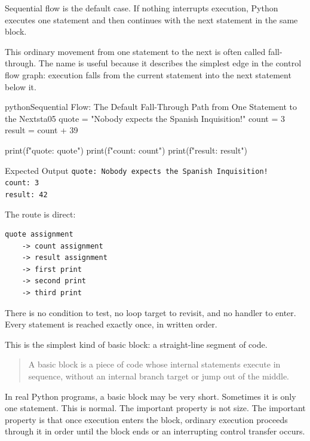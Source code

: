 \documentclass[a4paper,twoside]{report}
\begin{document}
Sequential flow is the default case. If nothing interrupts execution, Python executes one statement and then continues with the next statement in the same block.

This ordinary movement from one statement to the next is often called fall-through. The name is useful because it describes the simplest edge in the control flow graph: execution falls from the current statement into the next statement below it.

\begin{codebox}[]{python}{Sequential Flow: The Default Fall-Through Path from One Statement to the Next}{sta05}
quote = "Nobody expects the Spanish Inquisition!"
count = 3
result = count + 39

print(f"quote: {quote}")
print(f"count: {count}")
print(f"result: {result}")
\end{codebox}


\begin{iobox}{Expected Output}
\texttt{quote: Nobody expects the Spanish Inquisition!} \\
\texttt{count: 3} \\
\texttt{result: 42} \\
\end{iobox}


The route is direct:

\begin{verbatim}
quote assignment
    -> count assignment
    -> result assignment
    -> first print
    -> second print
    -> third print
\end{verbatim}

There is no condition to test, no loop target to revisit, and no handler to enter. Every statement is reached exactly once, in written order.

This is the simplest kind of basic block: a straight-line segment of code.

\begin{quote}
A basic block is a piece of code whose internal statements execute in sequence, without an internal branch target or jump out of the middle.
\end{quote}

In real Python programs, a basic block may be very short. Sometimes it is only one statement. This is normal. The important property is not size. The important property is that once execution enters the block, ordinary execution proceeds through it in order until the block ends or an interrupting control transfer occurs.
\end{document}
